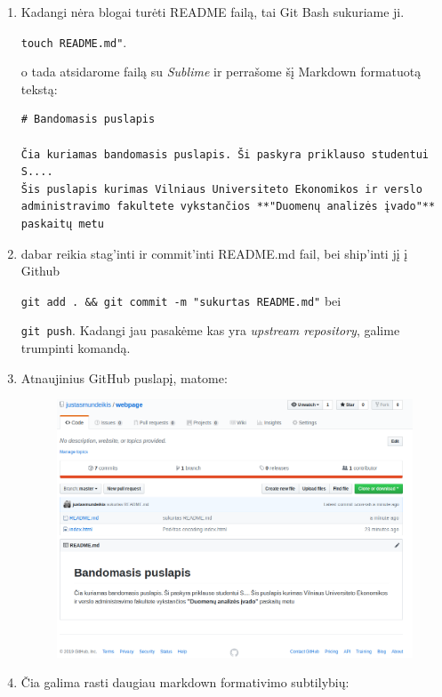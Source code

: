 \documentclass[11pt,a4paper]{article}
\begin{document}
\begin{enumerate}
\item Kadangi nėra blogai turėti README failą, tai Git Bash sukuriame ji.

\colorbox{listinggray}{\lstinline|touch README.md"|}.

o tada atsidarome failą su \textit{Sublime} ir perrašome šį Markdown formatuotą tekstą:

\begin{lstlisting}
# Bandomasis puslapis

Čia kuriamas bandomasis puslapis. Ši paskyra priklauso studentui S.... 
Šis puslapis kurimas Vilniaus Universiteto Ekonomikos ir verslo administravimo fakultete vykstančios **"Duomenų analizės įvado"** paskaitų metu
\end{lstlisting}

\item dabar reikia stag'inti ir commit'inti  README.md fail, bei ship'inti jį į Github


\colorbox{listinggray}{\lstinline|git add . && git commit -m "sukurtas README.md"|} bei

\colorbox{listinggray}{\lstinline|git push|}. Kadangi jau pasakėme kas yra \textit{upstream repository}, galime trumpinti komandą.

\item Atnaujinius GitHub puslapį, matome:

\begin{figure}[H]
\center
\includegraphics[scale=0.4]{webpage_8.png}
\end{figure}



\item Čia galima rasti daugiau markdown formativimo subtilybių: \href{https://guides.github.com/pdfs/markdown-cheatsheet-online.pdf}{\color{blue}{Markdown cheetsheat link}}


\end{enumerate}
\end{document}
